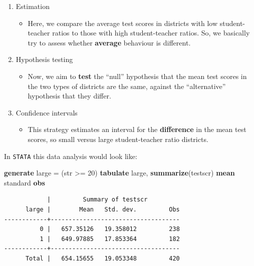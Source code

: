 \documentclass[
]{book}
\newenvironment{Shaded}{\begin{snugshade}}{\end{snugshade}}
\newcommand{\KeywordTok}[1]{\textcolor[rgb]{0.13,0.29,0.53}{\textbf{#1}}}
\newcommand{\NormalTok}[1]{#1}
\providecommand{\tightlist}{%
  \setlength{\itemsep}{0pt}\setlength{\parskip}{0pt}}
\begin{document}
\begin{enumerate}
\def\labelenumi{\arabic{enumi}.}
\tightlist
\item
  Estimation

  \begin{itemize}
  \tightlist
  \item
    Here, we compare the average test scores in districts with low student-teacher ratios to those with high student-teacher ratios. So, we basically try to assess whether \textbf{average} behaviour is different.
  \end{itemize}
\item
  Hypothesis testing

  \begin{itemize}
  \tightlist
  \item
    Now, we aim to \textbf{test} the ``null'' hypothesis that the mean test scores in the two types of districts are the same, against the ``alternative'' hypothesis that they differ.
  \end{itemize}
\item
  Confidence intervals

  \begin{itemize}
  \tightlist
  \item
    This strategy estimates an interval for the \textbf{difference} in the mean test scores, so small versus large student-teacher ratio districts.
  \end{itemize}
\end{enumerate}

In \texttt{STATA} this data analysis would look like:

\begin{Shaded}
\begin{Highlighting}[]
\KeywordTok{generate}\NormalTok{ large = (str \textgreater{}= 20)}
\KeywordTok{tabulate}\NormalTok{ large, }\KeywordTok{summarize}\NormalTok{(testscr) }\KeywordTok{mean}\NormalTok{ standard }\KeywordTok{obs}
\end{Highlighting}
\end{Shaded}

\begin{verbatim}
            |         Summary of testscr
      large |        Mean   Std. dev.         Obs
------------+------------------------------------
          0 |   657.35126   19.358012         238
          1 |   649.97885   17.853364         182
------------+------------------------------------
      Total |   654.15655   19.053348         420
\end{verbatim}
\end{document}
